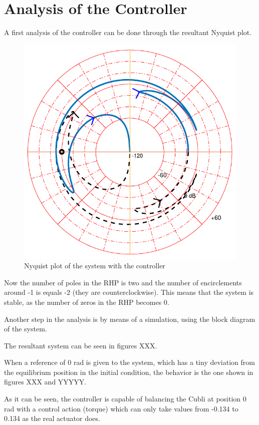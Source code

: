 \section{Analysis of the Controller}\label{analysisController}
A first analysis of the controller can be done through the resultant Nyquist plot.

\begin{figure}[H] 
	\centering 
	\includegraphics[scale=0.46]{figures/nyquistController}	
	\caption{Nyquist plot of the system with the controller}
	\label{nyquistController}
\end{figure}

Now the number of poles in the RHP is two and the number of encirclements around -1 is equals -2 (they are counterclockwise). This means that the system is stable, as the number of zeros in the RHP becomes 0.

Another step in the analysis is by means of a simulation, using the block diagram of the system.

The resultant system can be seen in figures XXX.


When a reference of 0 rad is given to the system, which has a tiny deviation from the equilibrium position in the initial condition, the behavior is the one shown in figures XXX and YYYYY. 


As it can be seen, the controller is capable of balancing the Cubli at position 0 rad with a control action (torque) which can only take values from -0.134 to 0.134 as the real actuator does.